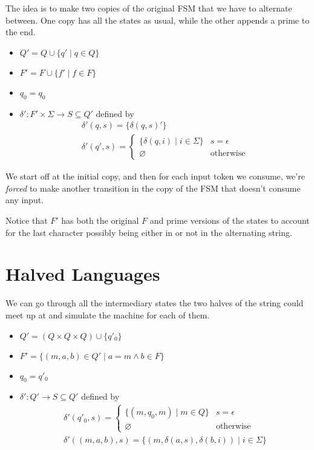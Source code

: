 \documentclass[12pt]{article}
\begin{document}
The idea is to make two copies of the original FSM that we have to alternate between.
One copy has all the states as usual, while the other appends a prime to the end.
\begin{itemize}[nolistsep]
    \item $Q'=Q \cup \{q' \mid q \in Q\}$
    \item $F'=F \cup \{f' \mid f \in F\}$
    \item $q_0=q_0$
    \item $\delta': F' \times \Sigma \rightarrow S \subseteq Q'$ defined by
          \begin{gather*}
              \delta'(q, s)=\{\delta(q, s)'\} \\
              \delta'\left(q', s\right)=\begin{cases}
                  \{\delta(q, i) \mid i \in \Sigma\} & s=\epsilon       \\
                  \varnothing                        & \text{otherwise}
              \end{cases}
          \end{gather*}
\end{itemize}

We start off at the initial copy, and then for each input token we consume,
we're \textit{forced} to make another transition in the copy of the FSM
that doesn't consume any input.

Notice that $F'$ has both the original $F$ and prime versions of the states
to account for the last character possibly being either in or not in
the alternating string.

\pagebreak

\section{Halved Languages}

We can go through all the intermediary states the two halves
of the string could meet up at and simulate the machine for each of them.
\begin{itemize}[nolistsep]
    \item $Q'=(Q \times Q \times Q) \cup \{q'_0\}$
    \item $F'=\{(m, a, b) \in Q' \mid a=m \land b \in F\}$
    \item $q_0=q'_0$
    \item $\delta': Q' \rightarrow S \subseteq Q'$ defined by
          \begin{gather*}
              \delta'(q'_0, s)=\begin{cases}
                  \{(m, q_0, m) \mid m \in Q\} & s=\epsilon       \\
                  \varnothing                  & \text{otherwise}
              \end{cases} \\
              \delta'((m, a, b), s)=\{(m, \delta(a, s), \delta(b, i)) \mid i \in \Sigma\}
          \end{gather*}
\end{itemize}
\end{document}
